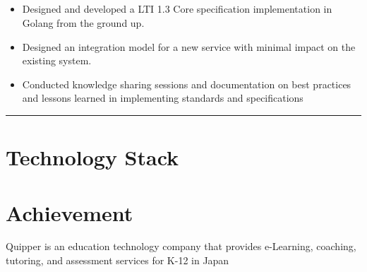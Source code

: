 \documentclass[12pt]{res} %
\begin{document}
\begin{resume}
\begin{multicols}{2}
	\section{}
		\begin{itemize}
			\setlength{\itemindent}{0pt}
			\item Designed and developed a LTI 1.3 Core specification implementation in Golang from the ground up.
			\item Designed an integration model for a new service with minimal impact on the existing system.
			\item Conducted knowledge sharing sessions and documentation on best practices and lessons learned in implementing standards and specifications
		\end{itemize}
\end{multicols}

\vspace{-20pt}
\begin{minipage}[t]{0.55\linewidth}
	\rule{0.25\textwidth}{2pt}
	\begin{multicols}{2}
		\section{Technology Stack}
		\columnbreak
		\section{}
	\end{multicols}
	\vspace{1pt}
\end{minipage}
\hfill
\begin{minipage}[t]{0.42\linewidth}
	\vspace{18pt}
	\section{Achievement}
	\begin{flushleft}
		Quipper is an education technology company that provides e-Learning, coaching, 
		tutoring, and assessment services for K-12 in Japan
	\end{flushleft}
\end{minipage}


\end{resume}
\end{document}

